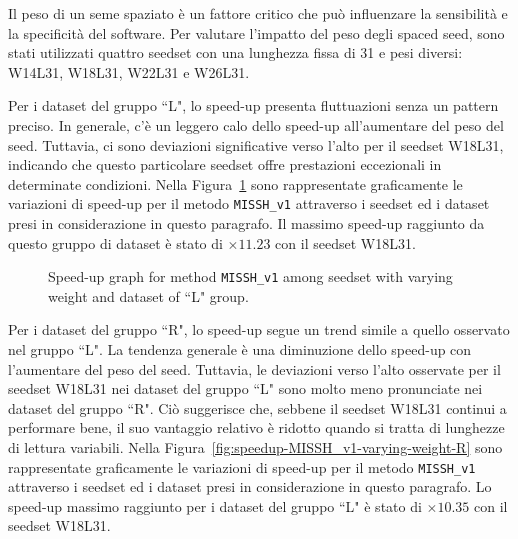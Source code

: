 	Il peso di un seme spaziato è un fattore critico che può influenzare la sensibilità e la specificità del software. Per valutare l'impatto del peso degli spaced seed, sono stati utilizzati quattro seedset con una lunghezza fissa di 31 e pesi diversi: W14L31, W18L31, W22L31 e W26L31. 
	
	
	Per i dataset del gruppo “L", lo speed-up presenta fluttuazioni senza un pattern preciso. In generale, c'è un leggero calo dello speed-up all'aumentare del peso del seed. Tuttavia, ci sono deviazioni significative verso l'alto per il seedset W18L31, indicando che questo particolare seedset offre prestazioni eccezionali in determinate condizioni. Nella Figura~\ref{fig:speedup-MISSH_v1-varying-weight-L} sono rappresentate graficamente le variazioni di speed-up per il metodo \verb|MISSH_v1| attraverso i seedset ed i dataset presi in considerazione in questo paragrafo. Il massimo speed-up raggiunto da questo gruppo di dataset è stato di $\times 11.23$ con il seedset W18L31.
	
	\begin{figure}[!ht]
		\centering
		\caption{Speed-up graph for method \texttt{MISSH\_v1} among seedset with varying weight and dataset of “L" group.}
		\label{fig:speedup-MISSH_v1-varying-weight-L}
	\end{figure}
	
	
	Per i dataset del gruppo “R", lo speed-up segue un trend simile a quello osservato nel gruppo “L". La tendenza generale è una diminuzione dello speed-up con l'aumentare del peso del seed. Tuttavia, le deviazioni verso l'alto osservate per il seedset W18L31 nei dataset del gruppo “L" sono molto meno pronunciate nei dataset del gruppo “R". Ciò suggerisce che, sebbene il seedset W18L31 continui a performare bene, il suo vantaggio relativo è ridotto quando si tratta di lunghezze di lettura variabili. Nella Figura~\ref{fig:speedup-MISSH_v1-varying-weight-R} sono rappresentate graficamente le variazioni di speed-up per il metodo \verb|MISSH_v1| attraverso i seedset ed i dataset presi in considerazione in questo paragrafo. Lo speed-up massimo raggiunto per i dataset del gruppo “L" è stato di $\times 10.35$ con il seedset W18L31.
	
